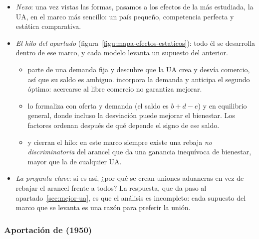 \documentclass[11pt]{article}
\begin{document}
\begin{itemize}
\item \emph{Nexo}: una vez vistas las formas, pasamos a los efectos de la más estudiada, la UA, en el marco más sencillo: un país pequeño, competencia perfecta y estática comparativa.
\item \emph{El hilo del apartado} (figura~\ref{figu:mapa-efectos-estaticos}): todo él se desarrolla dentro de ese marco, y cada modelo levanta un supuesto del anterior.
  \begin{itemize}
  \item {} parte de una demanda fija y descubre que la UA crea y desvía comercio, así que su saldo es ambiguo.  incorpora la demanda y anticipa el segundo óptimo: acercarse al libre comercio no garantiza mejorar.
  \item {} lo formaliza con oferta y demanda (el saldo es $b+d-e$) y en equilibrio general, donde incluso la desviación puede mejorar el bienestar. Los factores ordenan después de qué depende el signo de ese saldo.
  \item {} y  cierran el hilo: en este marco siempre existe una rebaja \emph{no discriminatoria} del arancel que da una ganancia inequívoca de bienestar, mayor que la de cualquier UA.
  \end{itemize}
\item \emph{La pregunta clave}: si es así, ¿por qué se crean uniones aduaneras en vez de rebajar el arancel frente a todos? La respuesta, que da paso al apartado~\ref{sec:mejor-ua}, es que el análisis es incompleto: cada supuesto del marco que se levanta es una razón para preferir la unión.
\end{itemize}

\begin{infografia}[H]
\centering
\caption{El hilo del análisis estático de las uniones aduaneras: de  a  y , y los supuestos que se levantan después}\label{figu:mapa-efectos-estaticos}
\end{infografia}

\subsubsection{Aportación de  (1950)}\label{sec:viner}
\end{document}
